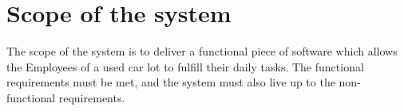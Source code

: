 \section{Scope of the system}
The scope of the system is to deliver a functional piece of software which allows the Employees of a used car lot to fulfill their daily tasks.  The functional requirements must be met, and the system must also live up to the non-functional requirements.